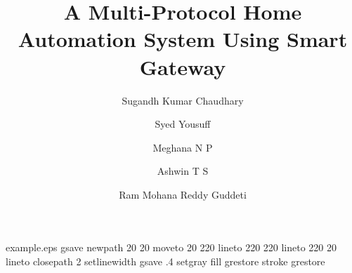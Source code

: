 %
%
%
%
%
\begin{filecontents*}{example.eps}
gsave
newpath
  20 20 moveto
  20 220 lineto
  220 220 lineto
  220 20 lineto
closepath
2 setlinewidth
gsave
  .4 setgray fill
grestore
stroke
grestore
\end{filecontents*}
%
\RequirePackage{fix-cm}
%
\documentclass[smallextended]{svjour3}       %
%
\smartqed  %
%
\usepackage{graphicx}
\usepackage{float}
\usepackage{array}
\usepackage{fixltx2e}
%
%
%
%
%


\title{A Multi-Protocol Home Automation System Using Smart Gateway%
}


\author{Sugandh Kumar Chaudhary  \and
        Syed Yousuff         \and
        Meghana N P \and
        Ashwin T S \and
        Ram Mohana Reddy Guddeti
}

